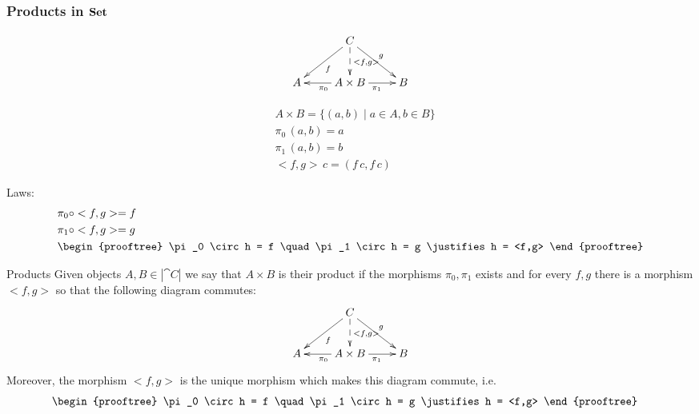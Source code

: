 \documentclass[handout]{beamer}
\newcommand{\ru}[2]{\vspace{1ex}
\begin{prooftree}
#1 \justifies #2
\end{prooftree}\vspace{1ex}}
\begin{document}
\begin{frame}
  \frametitle{Products in $\mathbf{Set}$}
  
  \[\xymatrix{
    & C \ar[dl]^f \ar[dr]^g \ar@{-->}[d]^{<f,g>} \\
    A & A\times B \ar[l]^{\pi_0} \ar[r]_{\pi_1} & B
  }\]

  \begin{align*}
    & A \times B = \{ (a,b) \mid a\in A, b\in B \}\\
    & \pi_0\,(a,b) = a \\
    & \pi_1\,(a,b) = b \\
    & <f,g>\,c = (f\,c,f\,c)
  \end{align*}

  Laws:\vspace{-2ex}
  \begin{align*}
    & \pi_0\circ <f,g> = f \\
    & \pi_1\circ <f,g> = g \\
    & \ru{\pi_0 \circ h = f \quad \pi_1 \circ h = g}
    { h = <f,g> }
  \end{align*}

\end{frame}

\begin{frame}
  \begin{block}{Products}
  Given objects $A,B\in|\cat{C}|$ we say that $A\times B$ is their product
  if the morphisms $\pi_0,\pi_1$ exists and for every $f,g$ there is a morphism
  $<f,g>$ so that the following diagram commutes:
  \[\xymatrix{
    & C \ar[dl]^f \ar[dr]^g \ar@{-->}[d]^{<f,g>} \\
    A & A\times B \ar[l]^{\pi_0} \ar[r]_{\pi_1} & B
  }\]
  Moreover, the morphism $<f,g>$ is the unique morphism which makes
  this diagram commute, i.e.
  \begin{align*}
    & \ru{\pi_0 \circ h = f \quad \pi_1 \circ h = g}
    { h = <f,g> }
  \end{align*}
  \end{block}

\end{frame}
\end{document}
